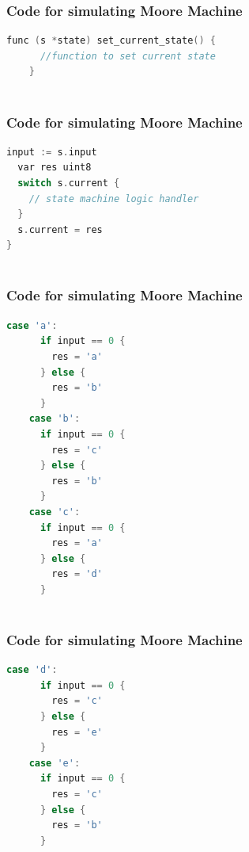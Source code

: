 \documentclass[xcolor=table]{beamer}
\begin{document}
 \begin{frame}[fragile]
  \frametitle{Code for simulating Moore Machine}
  \begin{lstlisting}[language=C,keywordstyle=\bf,stringstyle=\it]
    func (s *state) set_current_state() {
      //function to set current state 
    }
    
  \end{lstlisting}

\end{frame} 

\begin{frame}[fragile]
  \frametitle{Code for simulating Moore Machine}
\begin{lstlisting}[language=C,keywordstyle=\bf,stringstyle=\it]
  input := s.input 
  var res uint8
  switch s.current {
    // state machine logic handler 
  }
  s.current = res
}
   
  \end{lstlisting}
\end{frame}

\begin{frame}[fragile]
  \frametitle{Code for simulating Moore Machine}
\begin{lstlisting}[language=C,keywordstyle=\bf,stringstyle=\it]
    case 'a':
      if input == 0 {
        res = 'a'
      } else {
        res = 'b'
      }
    case 'b':
      if input == 0 {
        res = 'c'
      } else {
        res = 'b'
      }
    case 'c':
      if input == 0 {
        res = 'a'
      } else {
        res = 'd'
      }
  
  \end{lstlisting}
\end{frame}

\begin{frame}[fragile]
  \frametitle{Code for simulating Moore Machine}
\begin{lstlisting}[language=C,keywordstyle=\bf,stringstyle=\it]
    case 'd':
      if input == 0 {
        res = 'c'
      } else {
        res = 'e'
      }
    case 'e':
      if input == 0 {
        res = 'c'
      } else {
        res = 'b'
      }
  \end{lstlisting}
\end{frame}
\end{document}
